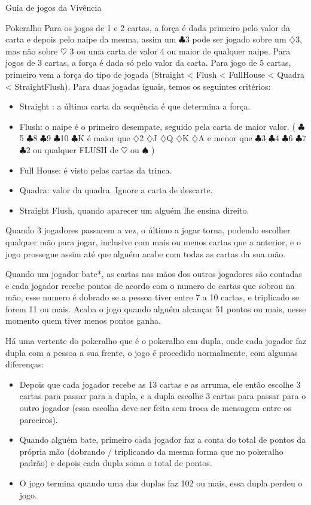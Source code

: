 \begin{secao}{Guia de jogos da Vivência }
\begin{subsecao}{Pokeralho}
Para os jogos de 1 e 2 cartas, a força é dada primeiro pelo valor da carta e depois pelo naipe da mesma, assim um $\clubsuit$3  pode ser jogado sobre um $\diamondsuit$3, mas não sobre $\heartsuit$ 3 ou uma carta de valor 4 ou maior de qualquer naipe. 
Para jogos de 3 cartas, a força é dada só pelo valor da carta. 
Para jogo de 5 cartas, primeiro vem a força do tipo de jogada (Straight < Flush < FullHouse < Quadra < StraightFlush). 
Para duas jogadas iguais, temos os seguintes critérios:
\begin{itemize}
	\item Straight : a última carta da sequência é que determina a força.
	\item Flush: o naipe é o primeiro desempate, seguido pela carta de maior valor.  ( $\clubsuit$5 $\clubsuit$8 $\clubsuit$9 $\clubsuit$10 $\clubsuit$K é maior que $\diamondsuit$2 $\diamondsuit$J $\diamondsuit$Q $\diamondsuit$K $\diamondsuit$A e menor que $\clubsuit$3 $\clubsuit$4 $\clubsuit$6 $\clubsuit$7 $\clubsuit$2 ou qualquer FLUSH de $\heartsuit$  ou $\spadesuit$  )
	\item Full House: é visto pelas cartas da trinca.	
	\item Quadra: valor da quadra. Ignore a carta de descarte.
	\item Straight Flush, quando aparecer um alguém lhe ensina direito.
\end{itemize}

Quando 3 jogadores passarem a vez, o último a jogar torna, podendo escolher qualquer mão para jogar, inclusive com mais ou menos cartas que a anterior, e o jogo prossegue assim até que alguém acabe com todas as cartas da sua mão. 

Quando um jogador bate*, as cartas nas mãos dos outros jogadores são contadas e cada jogador recebe pontos de acordo com o numero de cartas que sobrou na mão, esse numero é dobrado se a pessoa tiver entre 7 a 10 cartas, e triplicado se forem 11 ou mais. Acaba o jogo quando alguém alcançar 51 pontos ou mais, nesse momento quem tiver menos pontos ganha.

Há uma vertente do pokeralho que é o pokeralho em dupla, onde cada jogador faz dupla com a pessoa a sua frente, o jogo é procedido normalmente, com algumas diferenças: 
\begin{itemize}
\item Depois que cada jogador recebe as 13 cartas e as arruma, ele então escolhe 3 cartas para passar para a dupla, e a dupla escolhe 3 cartas para passar para o outro jogador (essa escolha deve ser feita sem troca de mensagem entre os parceiros). 
\item Quando alguém bate, primeiro cada jogador faz a conta do total de pontos da própria mão (dobrando / triplicando da mesma forma que no pokeralho padrão) e depois cada dupla soma o total de pontos. 
\item O jogo termina quando uma das duplas faz 102 ou mais, essa dupla perdeu o jogo. 


\end{itemize}
\end{subsecao}
\end{secao}
